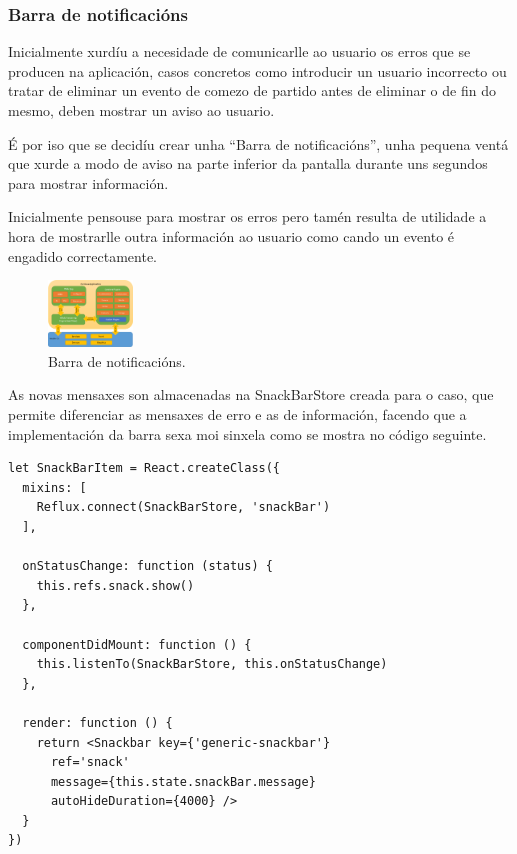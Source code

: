       \subsubsection{Barra de notificacións}
      Inicialmente xurdíu a necesidade de comunicarlle ao usuario os erros que 
se producen na aplicación, casos concretos como introducir un usuario 
incorrecto ou tratar de eliminar un evento de comezo de partido antes de 
eliminar o de fin do mesmo, deben mostrar un aviso ao usuario.

      É por iso que se decidíu crear unha ``Barra de notificacións'', unha 
pequena ventá que xurde a modo de aviso na parte inferior da pantalla durante 
uns segundos para mostrar información.

      Inicialmente pensouse para mostrar os erros pero tamén resulta de 
utilidade a hora de mostrarlle outra información ao usuario como cando un 
evento é engadido correctamente.

      \begin{figure}[h!]
        \begin{center}
        \includegraphics[width=0.2\textwidth]{./img/cordova_arquitectura.png}
        \caption{Barra de notificacións.}
        \end{center}
      \end{figure}

      As novas mensaxes son almacenadas na SnackBarStore creada para o caso, 
que permite diferenciar as mensaxes de erro e as de información, facendo que a 
implementación da barra sexa moi sinxela como se mostra no código seguinte.

      \begin{lstlisting}[frame=single, caption=Barra de notificacións.]
let SnackBarItem = React.createClass({
  mixins: [
    Reflux.connect(SnackBarStore, 'snackBar')
  ],

  onStatusChange: function (status) {
    this.refs.snack.show()
  },

  componentDidMount: function () {
    this.listenTo(SnackBarStore, this.onStatusChange)
  },

  render: function () {
    return <Snackbar key={'generic-snackbar'}
      ref='snack'
      message={this.state.snackBar.message}
      autoHideDuration={4000} />
  }
})

      \end{lstlisting}

